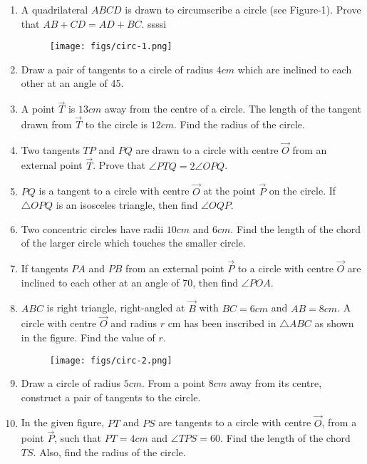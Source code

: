 \begin{enumerate}
	\item A quadrilateral $ABCD$ is drawn to circumscribe a circle (see Figure-1). Prove that $AB + CD = AD + BC$.
ssssi	\begin{figure}[!htb]
		\centering
			\texttt{[image: figs/circ-1.png]}
		
		\caption{}
		\label{fig:circ-1}
	\end{figure}
	\item Draw a pair of tangents to a circle of radius $4 cm$ which are inclined to each other at an angle of 45\degree.	
	\item A point $\vec{T}$ is $13 cm$ away from the centre of a circle. The length of the tangent drawn from $\vec{T}$ to the circle is $12 cm$. Find the radius of the circle.
	\item Two tangents $TP$ and $PQ$ are drawn to a circle with centre $\vec{O}$ from an external point $\vec{T}$. Prove that $\angle PTQ = 2 \angle OPQ$.
	\item $PQ$ is a tangent to a circle with centre $\vec{O}$ at the point $\vec{P}$ on the circle. If $\triangle OPQ$ is an isosceles triangle, then find $\angle OQP$.
	\item Two concentric circles have radii $10 cm$ and $6 cm$. Find the length of the chord of the larger circle which touches the smaller circle.
	\item If tangents $PA$ and $PB$ from an external point $\vec{P}$ to a circle with centre $\vec{O}$ are inclined to each other at an angle of 70\degree, then find $\angle POA$.
	\item $ABC$ is right triangle, right-angled at $\vec{B}$ with $BC = 6 cm$ and $AB = 8 cm$. A circle with centre $\vec{O}$ and radius $r$ cm has been inscribed in $\triangle ABC$ as shown in the figure. Find the value of $r$.
		\begin{figure}[H]
			\centering
			\texttt{[image: figs/circ-2.png]}
			\caption{}
			\label{fig:circ-2}
		\end{figure}
	\item Draw a circle of radius $5 cm$. From a point $8 cm$ away from its centre, construct a pair of tangents to the circle.
	\item In the given figure, $PT$ and $PS$ are tangents to a circle with centre $\vec{O}$, from a point $\vec{P}$, such that $PT = 4 cm$ and $\angle TPS = 60$\degree. Find the length of the chord $TS$. Also, find the radius of the circle.
		\begin{figure}[H]

\end{figure}
\end{enumerate}
